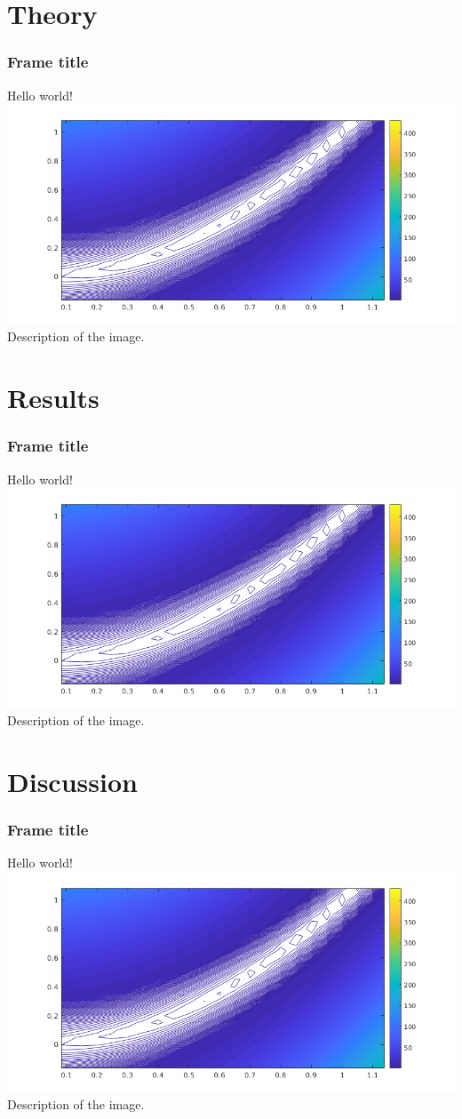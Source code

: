 \documentclass[aspectratio=169]{beamer}
\begin{document}
\section{Theory}
\begin{frame}
 \frametitle{Frame title }
 Hello world!\\
 \includegraphics[scale=0.5]{images/rosenbrockzoom.png}\\
 Description of the image.
\end{frame}

\section{Results}
\begin{frame}
 \frametitle{Frame title }
 Hello world!\\
 \includegraphics[scale=0.5]{images/rosenbrockzoom.png}\\
 Description of the image.
\end{frame}

\section{Discussion}
\begin{frame}
 \frametitle{Frame title }
 Hello world!\\
 \includegraphics[scale=0.5]{images/rosenbrockzoom.png}\\
 Description of the image.
\end{frame}
\end{document}
